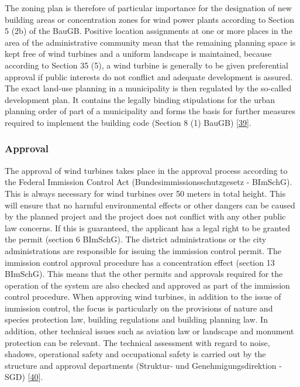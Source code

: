 \documentclass[a4paper,11pt]{article}
\begin{document}
The zoning plan is therefore of particular importance for the designation of new building areas or concentration zones for wind power plants according to Section 5 (2b) of the BauGB. Positive location assignments at one or more places in the area of the administrative community mean that the remaining planning space is kept free of wind turbines and a uniform landscape is maintained, because according to Section 35 (5), a wind turbine is generally to be given preferential approval if public interests do not conflict and adequate development is assured. The exact land-use planning in a municipality is then regulated by the so-called development plan. It contains the legally binding stipulations for the urban planning order of part of a municipality and forms the basis for further measures required to implement the building code (Section 8 (1) BauGB) {[}\protect\hyperlink{ref-BundesministeriumderJustizundfurVerbraucherschutz.1960}{39}{]}.

\hypertarget{approval}{%
\subsubsection{Approval}\label{approval}}

The approval of wind turbines takes place in the approval process according to the Federal Immission Control Act (Bundesimmissionsschutzgesetz - BImSchG). This is always necessary for wind turbines over 50 meters in total height. This will ensure that no harmful environmental effects or other dangers can be caused by the planned project and the project does not conflict with any other public law concerns. If this is guaranteed, the applicant has a legal right to be granted the permit (section 6 BImSchG). The district administrations or the city administrations are responsible for issuing the immission control permit. The immission control approval procedure has a concentration effect (section 13 BImSchG). This means that the other permits and approvals required for the operation of the system are also checked and approved as part of the immission control procedure. When approving wind turbines, in addition to the issue of immission control, the focus is particularly on the provisions of nature and species protection law, building regulations and building planning law. In addition, other technical issues such as aviation law or landscape and monument protection can be relevant. The technical assessment with regard to noise, shadows, operational safety and occupational safety is carried out by the structure and approval departments (Struktur- und Genehmigungsdirektion - SGD) {[}\protect\hyperlink{ref-FachagenturWindenergieanLand.2021}{40}{]}.
\end{document}
